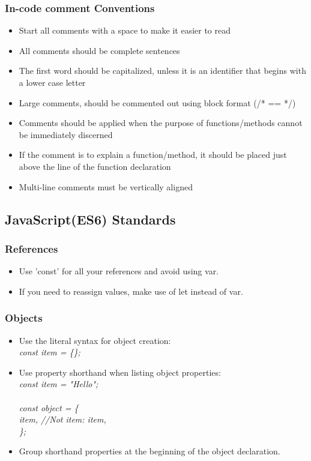 \documentclass[12pt]{report}
\begin{document}
\subsubsection{In-code comment Conventions}
	\begin{itemize}[noitemsep]
    	\item Start all comments with a space to make it easier to read
    	\item All comments should be complete sentences
        \item The first word should be capitalized, unless it is an identifier that begins with a lower case letter
		\item Large comments, should be commented out using block format (/* == */)
        \item Comments should be applied when the purpose of functions/methods cannot be immediately discerned
        \item If the comment is to explain a function/method, it should be placed just above the line of the function declaration
        \item Multi-line comments must be vertically aligned
    \end{itemize}

\pagebreak
\subsection{JavaScript(ES6) Standards}
\subsubsection{References}
\begin{itemize}[noitemsep]
\item Use 'const' for all your references and avoid using var.
\item If you need to reassign values, make use of let instead of var.
\end{itemize}

\subsubsection{Objects}
\begin{itemize}[noitemsep]
\item Use the literal syntax for object creation: \\
	\textit{\hspace*{4ex}const item = \{\}; }
\item Use property shorthand when listing object properties: \\
	\textit{
      const item = "Hello";\\
      \\
      const object = \{ \\ 
      \hspace*{4ex}item, \hspace*{4ex}//Not item: item,\\
      \};
    }
    \item Group shorthand properties at the beginning of the object declaration.
\end{itemize}
\end{document}
